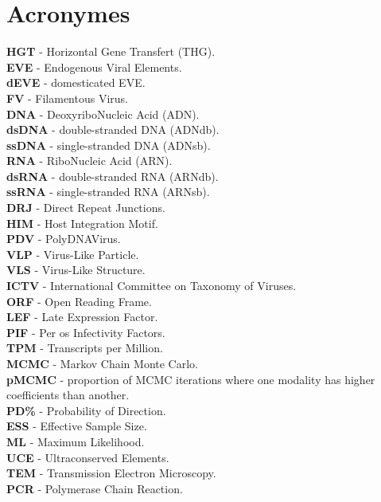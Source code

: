 \chapter*{Acronymes}


\textbf{HGT} - Horizontal Gene Transfert (THG).\\
\textbf{EVE} - Endogenous Viral Elements.\\
\textbf{dEVE} - domesticated EVE.\\
\textbf{FV} - Filamentous Virus.\\
\textbf{DNA} - DeoxyriboNucleic Acid (ADN).\\
\textbf{dsDNA} - double-stranded DNA (ADNdb).\\
\textbf{ssDNA} - single-stranded  DNA (ADNsb).\\
\textbf{RNA} - RiboNucleic Acid (ARN).\\
\textbf{dsRNA} - double-stranded RNA (ARNdb).\\
\textbf{ssRNA} - single-stranded RNA (ARNsb).\\
\textbf{DRJ} - Direct Repeat Junctions.\\
\textbf{HIM} - Host Integration Motif.\\
\textbf{PDV} - PolyDNAVirus.\\
\textbf{VLP} - Virus-Like Particle.\\
\textbf{VLS} - Virus-Like Structure.\\
\textbf{ICTV} - International Committee on Taxonomy of Viruses.\\
\textbf{ORF} - Open Reading Frame.\\
\textbf{LEF} - Late Expression Factor.\\
\textbf{PIF} - Per os Infectivity Factors.\\
\textbf{TPM} - Transcripts per Million.\\
\textbf{MCMC} - Markov Chain Monte Carlo.\\
\textbf{pMCMC} - proportion of MCMC iterations where one modality has higher coefficients than another.\\
\textbf{PD\%} - Probability of Direction.\\
\textbf{ESS} - Effective Sample Size.\\
\textbf{ML} - Maximum Likelihood.\\
\textbf{UCE} - Ultraconserved Elements.\\
\textbf{TEM} - Transmission Electron Microscopy.\\
\textbf{PCR} - Polymerase Chain Reaction.\\
